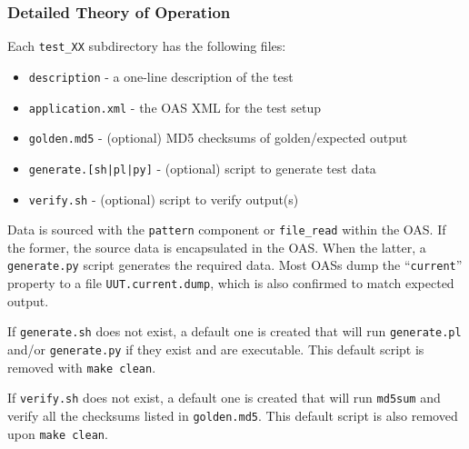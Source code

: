 \subsubsection*{Detailed Theory of Operation}
\begin{flushleft}
  Each \verb+test_XX+ subdirectory has the following files:

  \begin{itemize}{}{}
    \item \texttt{description} - a one-line description of the test
    \item \texttt{application.xml} - the OAS XML for the test setup
    \item \texttt{golden.md5} - (optional) MD5 checksums of golden/expected output
    \item \texttt{generate.[sh|pl|py]} - (optional) script to generate test data
    \item \texttt{verify.sh} - (optional) script to verify output(s)
  \end{itemize}

	Data is sourced with the \verb+pattern+ component or \verb+file_read+ within the OAS. If the former, the source data is encapsulated in the OAS. When the latter, a \verb+generate.py+ script generates the required data. Most OASs dump the ``\texttt{current}'' property to a file \verb+UUT.current.dump+, which is also confirmed to match expected output.
  \medskip

  If \texttt{generate.sh} does not exist, a default one is created that will run \texttt{generate.pl} and/or \texttt{generate.py} if they exist and are executable. This default script is removed with \verb+make clean+.
  \medskip

	If \texttt{verify.sh} does not exist, a default one is created that will run \texttt{md5sum} and verify all the checksums listed in \texttt{golden.md5}. This default script is also removed upon \verb+make clean+.
  \medskip
\end{flushleft}

